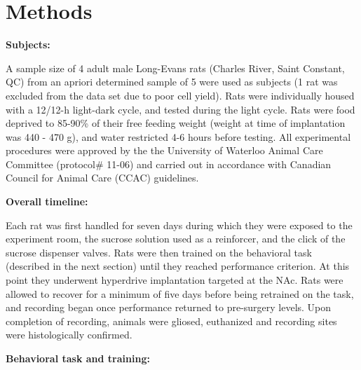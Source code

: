 \documentclass[11pt]{article}
\begin{document}
\section*{Methods}

{\bf Subjects:}

A sample size of 4 adult male Long-Evans rats (Charles River, Saint Constant, QC) from an apriori determined sample of 5 
were used as subjects (1 rat was excluded from the data set due to poor cell yield). Rats were individually housed with a 12/12-h
light-dark cycle, and tested during the light cycle. Rats were food
deprived to 85-90\% of their free feeding weight (weight at time of
implantation was 440 - 470 g), and water restricted 4-6 hours before
testing. All experimental procedures were approved by the the
University of Waterloo Animal Care Committee (protocol\# 11-06) and
carried out in accordance with Canadian Council for Animal Care (CCAC)
guidelines.

{\bf Overall timeline:}

Each rat was first handled for seven days during which they were
exposed to the experiment room, the sucrose solution used as a
reinforcer, and the click of the sucrose dispenser valves. Rats were
then trained on the behavioral task (described in the next section)
until they reached performance criterion. At this point they
underwent hyperdrive implantation targeted at the NAc. Rats were
allowed to recover for a minimum of five days before being retrained
on the task, and recording began once performance returned to
pre-surgery levels. Upon completion of recording, animals were gliosed,
euthanized and recording sites were histologically confirmed.

{\bf Behavioral task and training:}
\end{document}
